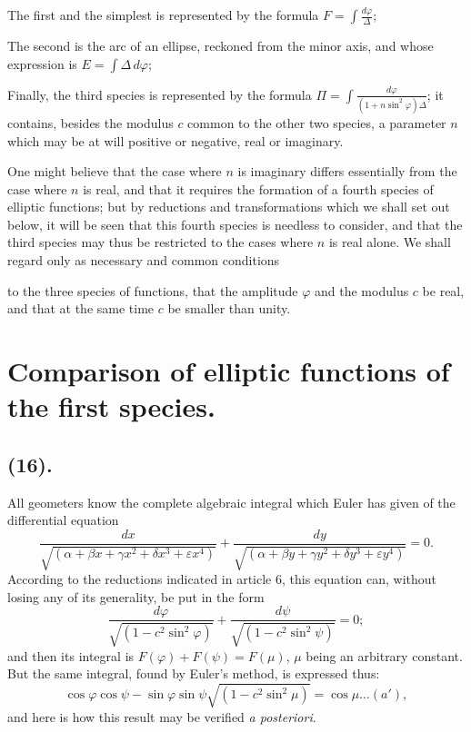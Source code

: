 \documentclass{article}
\begin{document}
The first and the simplest is represented by the formula $F=\displaystyle\int\frac{d\varphi}{\Delta}$;

The second is the arc of an ellipse, reckoned from the minor axis, and whose expression is $E=\displaystyle\int\Delta\,d\varphi$;

Finally, the third species is represented by the formula $\Pi=\displaystyle\int\frac{d\varphi}{(1+n\sin^{2}\varphi)\Delta}$; it contains, besides the modulus $c$ common to the other two species, a parameter $n$ which may be at will positive or negative, real or imaginary.

One might believe that the case where $n$ is imaginary differs essentially from the case where $n$ is real, and that it requires the formation of a fourth species of elliptic functions; but by reductions and transformations which we shall set out below, it will be seen that this fourth species is needless to consider, and that the third species may thus be restricted to the cases where $n$ is real alone. We shall regard only as necessary and common conditions

to the three species of functions, that the amplitude $\varphi$ and the modulus $c$ be real, and that at the same time $c$ be smaller than unity.

\section*{Comparison of elliptic functions of the first species.}

\subsection*{(16).}

All geometers know the complete algebraic integral which Euler has given of the differential equation
\[ \frac{dx}{\sqrt{(\alpha+\beta x+\gamma x^{2}+\delta x^{3}+\varepsilon x^{4})}}+\frac{dy}{\sqrt{(\alpha+\beta y+\gamma y^{2}+\delta y^{3}+\varepsilon y^{4})}}=0. \]
According to the reductions indicated in article 6, this equation can, without losing any of its generality, be put in the form
\[ \frac{d\varphi}{\sqrt{(1-c^{2}\sin^{2}\varphi)}}+\frac{d\psi}{\sqrt{(1-c^{2}\sin^{2}\psi)}}=0; \]
and then its integral is $F(\varphi)+F(\psi)=F(\mu)$, $\mu$ being an arbitrary constant. But the same integral, found by Euler's method, is expressed thus:
\[ \cos\varphi\cos\psi-\sin\varphi\sin\psi\sqrt{(1-c^{2}\sin^{2}\mu)}=\cos\mu\ldots(a'), \]
and here is how this result may be verified \emph{a posteriori}.
\end{document}

